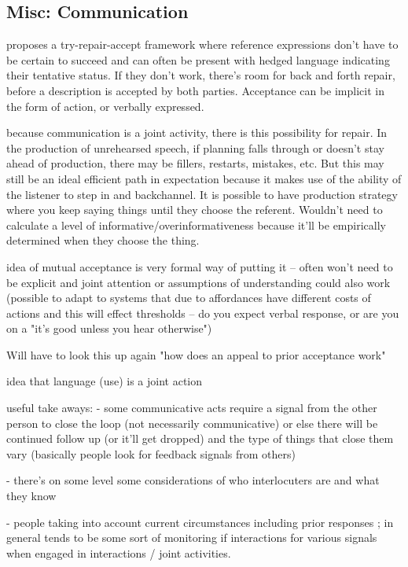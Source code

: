 \documentclass[]{article}
\begin{document}
\subsection{Misc: Communication}

\cite{clark1986} proposes a try-repair-accept framework where reference expressions don't have to be certain to succeed and can often be present with hedged language indicating their tentative status. If they don't work, there's room for back and forth repair, before a description is accepted by both parties. Acceptance can be implicit in the form of action, or verbally expressed. 

\cite{clark1986} because communication is a joint activity, there is this possibility for repair. In the production of unrehearsed speech, if planning falls through or doesn't stay ahead of production, there may be fillers, restarts, mistakes, etc. But this may still be an ideal efficient path in expectation because it makes use of the ability of the listener to step in and backchannel. It is possible to have production strategy where you keep saying things until they choose the referent. Wouldn't need to calculate a level of informative/overinformativeness because it'll be empirically determined when they choose the thing. 

\cite{clark1986} idea of mutual acceptance is very formal way of putting it -- often won't need to be explicit and joint attention or assumptions of understanding could also work (possible to adapt to systems that due to affordances have different costs of actions and this will effect thresholds -- do you expect verbal response, or are you on a "it's good unless you hear otherwise") 

\cite{clark1986} Will have to look this up again "how does an appeal to prior acceptance work"



\cite{clark1996} idea that language (use) is a joint action

\cite{clark1996} useful take aways: - some communicative acts require a signal from the other person to close the loop (not necessarily communicative) or else there will be continued follow up (or it’ll get dropped) and the type of things that close them vary (basically people look for feedback signals from others)

- there’s on some level some considerations of who interlocuters are and what they know

- people taking into account current circumstances including prior responses ; in general tends to be some sort of monitoring if interactions for various signals when engaged in interactions / joint activities.
\end{document}
